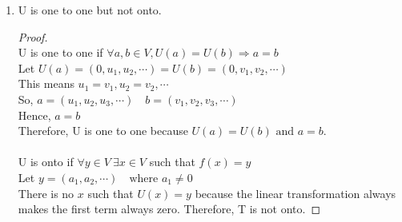 \documentclass[11pt]{scrartcl}
\begin{document}
\begin{enumerate}[label=\alph*.]
{\begin{proof}
			Since y was chosen arbitrarily, there exists an x for any y.\\
			Therefore, T is onto.\\
			\-\\
			T is one to one if $\forall a,b \in V, T(a) = T(b) \Rightarrow a = b$\\
			Let $ a = (u_{\alpha}, u_2, u_3, \cdots) \quad b = (u_{\gamma}, u_2, u_3, \cdots) \quad \text{where } u_{\alpha} \neq u_{\gamma} \Leftrightarrow a \neq b$\\
			$T(a) = (u_2, u_3, \cdots) \quad T(b) = (u_2, u_3, \cdots)$\\
			Therefore, T is not one to one because $T(a) = T(b) \text{ and }a \neq b$.
			\end{proof}
			}
		\item{
			U is one to one but not onto.
			\begin{proof}
			\-\\
			U is one to one if $\forall a,b \in V, U(a) = U(b) \Rightarrow a = b$\\
			Let $U(a) = (0, u_1, u_2, \cdots) = U(b) = (0, v_1, v_2, \cdots)$\\
			This means $u_1 = v_1, u_2 = v_2, \cdots$\\
			So, $ a = (u_1, u_2, u_3, \cdots) \quad b = (v_1, v_2, v_3, \cdots)$\\
			Hence, $a = b$\\
			Therefore, U is one to one because $U(a) = U(b) \text{ and }a = b$.\\
			\-\\
			U is onto if $\forall y \in V \ \exists x \in V$ such that $f(x)=y$\\
			Let $y = (a_1, a_2, \cdots) \quad \text{where } a_1 \neq 0$\\
			There is no $x$ such that $U(x) = y$ because the linear transformation always makes the first term always zero.	Therefore, T is not onto.
			\end{proof}
			}
\end{enumerate}
	
\end{document}
